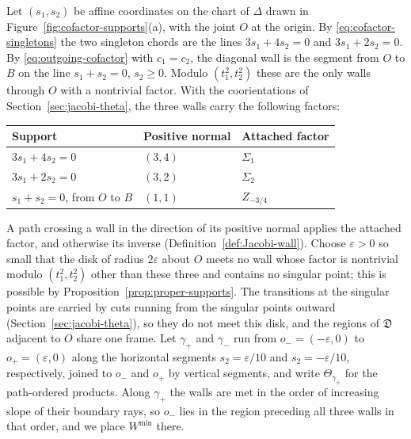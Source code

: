 Let $(s_1,s_2)$ be affine coordinates on the chart of $\Delta$ drawn in
Figure~\ref{fig:cofactor-supports}(a), with the joint $O$ at the origin.  By \eqref{eq:cofactor-singletons} the two singleton
chords are the lines $3s_1+4s_2=0$ and $3s_1+2s_2=0$.  By
\eqref{eq:outgoing-cofactor} with $c_1=c_2$, the diagonal wall is the
segment from $O$ to $B$ on the line $s_1+s_2=0$, $s_2\geq0$.  Modulo $(t_1^2,t_2^2)$ these are the only walls
through $O$ with a nontrivial factor.  With the coorientations of
Section~\ref{sec:jacobi-theta}, the three walls carry the following factors:
\begin{center}
\begin{tabular}{lll}
\toprule
Support & Positive normal & Attached factor\\
\midrule
$3s_1+4s_2=0$ & $(3,4)$ & $\Sigma_1$\\
$3s_1+2s_2=0$ & $(3,2)$ & $\Sigma_2$\\
$s_1+s_2=0$, from $O$ to $B$ & $(1,1)$ & $Z_{-3/4}$\\
\bottomrule
\end{tabular}
\end{center}
A path crossing a wall in the direction of its positive normal applies the
attached factor, and otherwise its inverse
(Definition~\ref{def:Jacobi-wall}).  Choose $\varepsilon>0$ so small that
the disk of radius $2\varepsilon$ about $O$ meets no wall whose factor is
nontrivial modulo $(t_1^2,t_2^2)$ other than these three and contains no
singular point; this is possible by Proposition~\ref{prop:proper-supports}.  The
transitions at the singular points are carried by cuts running from the
singular points outward (Section~\ref{sec:jacobi-theta}), so they do not meet
this disk, and the regions of $\mathfrak D$ adjacent to $O$ share one frame.  Let $\gamma_+$
and $\gamma_-$ run from $o_-=(-\varepsilon,0)$ to $o_+=(\varepsilon,0)$ along
the horizontal segments $s_2=\varepsilon/10$ and $s_2=-\varepsilon/10$,
respectively, joined to $o_-$ and $o_+$ by vertical segments, and write
$\Theta_{\gamma_\pm}$ for the path-ordered products.  Along $\gamma_+$ the
walls are met in the order of increasing slope of their boundary rays, so
$o_-$ lies in the region preceding all three walls in that order, and we
place $W^{\min}$ there.

